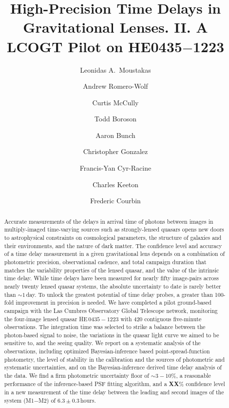 \documentclass[iop]{emulateapj}
\begin{document}
\title{High-Precision Time Delays in Gravitational Lenses. II. A LCOGT Pilot on HE0435$-$1223}
\author{Leonidas A.\ Moustakas}
\author{Andrew Romero-Wolf}
\author{Curtis McCully}
\author{Todd Boroson}
\author{Aaron Bunch}
\author{Christopher Gonzalez}
\author{Francis-Yan Cyr-Racine}
\author{Charles Keeton}
\author{Frederic Courbin}


\begin{abstract} 
  Accurate measurements of the delays in arrival time of photons
  between images in multiply-imaged time-varying sources such as
  strongly-lensed quasars opens new doors to astrophysical constraints
  on cosmological parameters, the structure of galaxies and their
  environments, and the nature of dark matter. The confidence level
  and accuracy of a time delay measurement in a given gravitational
  lens depends on a combination of photometric precision,
  observational cadence, and total campaign duration that matches the
  variability properties of the lensed quasar, and the value of the
  intrinsic time delay.  While time delays have been measured for
  nearly fifty image-pairs across nearly twenty lensed quasar systems,
  the absolute uncertainty to date is rarely better than $\sim1$\,day.
  To unlock the greatest potential of time delay probes, a greater
  than 100-fold improvement in precision is needed. We have completed
  a pilot ground-based campaign with the Las Cumbres Observatory
  Global Telescope network, monitoring the four-image lensed quasar
  HE\,$0435-1223$ with 420 contiguous five-minute observations. The
  integration time was selected to strike a balance between the
  photon-based signal to noise, the variations in the quasar light
  curve we aimed to be sensitive to, and the seeing quality.  We
  report on a systematic analysis of the observations, including
  optimized Bayesian-inference based point-spread-function photometry,
  the level of stability in the calibration and the sources of
  photometric and systematic uncertainties, and on the
  Bayesian-inference derived time delay analysis of the data. We find
  a firm photometric uncertainty floor of $\sim3-10$\%, a reasonable
  performance of the inference-based PSF fitting algorithm, and a
  {\bf XX}\% confidence level in a new measurement of the time delay
  between the leading and second images of the system (M1$-$M2) of
  $6.3\pm0.3$\,hours.  
\end{abstract}
\end{document}
